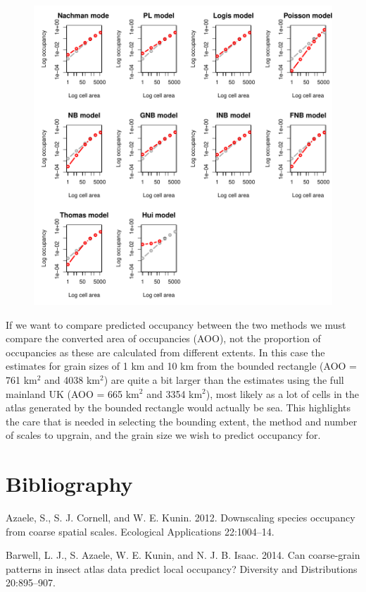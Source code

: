 \documentclass{article}[12pt, a4paper]
\begin{document}
\begin{figure}[!ht]
\centering
\includegraphics[width=\linewidth]{Downscaling-downscale42}
\end{figure}

If we want to compare predicted occupancy between the two methods we must compare the converted area of occupancies (AOO), not the proportion of occupancies as these are calculated from different extents. In this case the estimates for grain sizes of 1 km and 10 km from the bounded rectangle (AOO = 761 km$^2$ and 4038 km$^2$) are quite a bit larger than the estimates using the full mainland UK (AOO = 665 km$^2$ and 3354 km$^2$), most likely as a lot of cells in the atlas generated by the bounded rectangle would actually be sea. This highlights the care that is needed in selecting the bounding extent, the method and number of scales to upgrain, and the grain size we wish to predict occupancy for.

\section{Bibliography}

Azaele, S., S. J. Cornell, and W. E. Kunin. 2012. Downscaling species occupancy from coarse spatial scales. Ecological Applications 22:1004–14.

Barwell, L. J., S. Azaele, W. E. Kunin, and N. J. B. Isaac. 2014. Can coarse-grain patterns in insect atlas data predict local occupancy? Diversity and Distributions 20:895–907.
\end{document}
